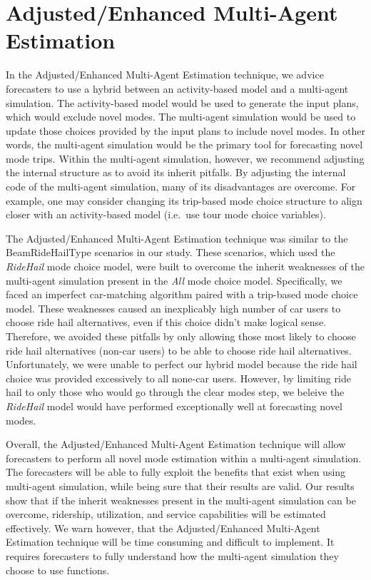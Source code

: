 \documentclass[12pt, oneside, openright]{byuthesis}
\begin{document}
\hypertarget{adjustedenhanced-multi-agent-estimation}{%
\section{Adjusted/Enhanced Multi-Agent Estimation}\label{adjustedenhanced-multi-agent-estimation}}

In the Adjusted/Enhanced Multi-Agent Estimation technique, we advice forecasters to use a hybrid between an activity-based model and a multi-agent simulation. The activity-based model would be used to generate the input plans, which would exclude novel modes. The multi-agent simulation would be used to update those choices provided by the input plans to include novel modes. In other words, the multi-agent simulation would be the primary tool for forecasting novel mode trips. Within the multi-agent simulation, however, we recommend adjusting the internal structure as to avoid its inherit pitfalls. By adjusting the internal code of the multi-agent simulation, many of its disadvantages are overcome. For example, one may consider changing its trip-based mode choice structure to align closer with an activity-based model (i.e.~use tour mode choice variables).

The Adjusted/Enhanced Multi-Agent Estimation technique was similar to the BeamRideHailType scenarios in our study. These scenarios, which used the \emph{RideHail} mode choice model, were built to overcome the inherit weaknesses of the multi-agent simulation present in the \emph{All} mode choice model. Specifically, we faced an imperfect car-matching algorithm paired with a trip-based mode choice model. These weaknesses caused an inexplicably high number of car users to choose ride hail alternatives, even if this choice didn't make logical sense. Therefore, we avoided these pitfalls by only allowing those most likely to choose ride hail alternatives (non-car users) to be able to choose ride hail alternatives. Unfortunately, we were unable to perfect our hybrid model because the ride hail choice was provided excessively to all none-car users. However, by limiting ride hail to only those who would go through the clear modes step, we beleive the \emph{RideHail} model would have performed exceptionally well at forecasting novel modes.

Overall, the Adjusted/Enhanced Multi-Agent Estimation technique will allow forecasters to perform all novel mode estimation within a multi-agent simulation. The forecasters will be able to fully exploit the benefits that exist when using multi-agent simulation, while being sure that their results are valid. Our results show that if the inherit weaknesses present in the multi-agent simulation can be overcome, ridership, utilization, and service capabilities will be estimated effectively. We warn however, that the Adjusted/Enhanced Multi-Agent Estimation technique will be time consuming and difficult to implement. It requires forecasters to fully understand how the multi-agent simulation they choose to use functions.
\end{document}
